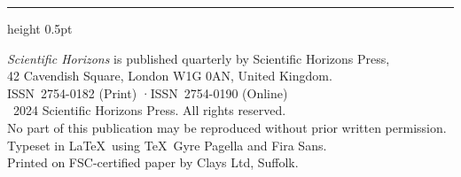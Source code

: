 \documentclass[a4paper,11pt]{article}
\begin{document}
\vspace{10pt}
{\color{lightrule}\hrule height 0.5pt}
\vspace{10pt}

\begin{center}
{\sffamily\footnotesize\color{graytext}
\textit{Scientific Horizons} is published quarterly by Scientific Horizons Press,\\
42 Cavendish Square, London W1G 0AN, United Kingdom.\\
ISSN\ 2754-0182 (Print) \quad·\quad ISSN\ 2754-0190 (Online)\\[4pt]
\textcopyright\ 2024 Scientific Horizons Press. All rights reserved.\\
No part of this publication may be reproduced without prior written permission.\\[4pt]
Typeset in \LaTeX\ using \TeX\ Gyre Pagella and Fira Sans.\\
Printed on FSC-certified paper by Clays Ltd, Suffolk.
}
\end{center}
\end{document}
